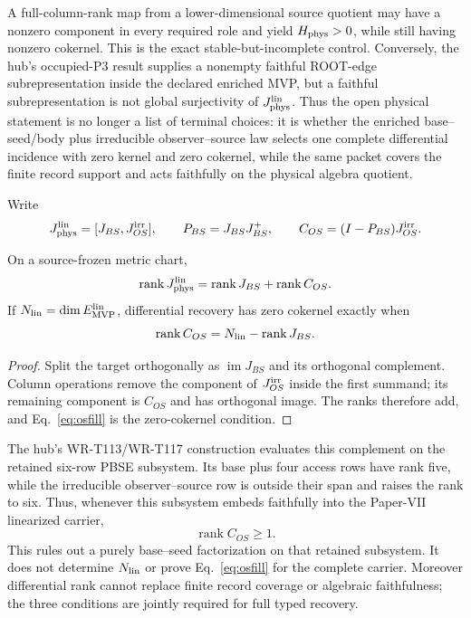 A full-column-rank map from a lower-dimensional source quotient may have a
nonzero component in every required role and yield $H_{\rm phys}>0$, while
still having nonzero cokernel.  This is the exact stable-but-incomplete
control.  Conversely, the hub's occupied-P3 result supplies a nonempty
faithful ROOT-edge subrepresentation inside the declared enriched MVP, but a
faithful subrepresentation is not global surjectivity of
$J_{\rm phys}^{\rm lin}$.
Thus the open physical statement is no longer a list of terminal choices: it
is whether the enriched base--seed/body plus irreducible observer--source law
selects one complete differential incidence with zero kernel and zero
cokernel, while the same packet covers the finite record support and acts
faithfully on the physical algebra quotient.

Write
\begin{equation}
J_{\rm phys}^{\rm lin}=[J_{BS},J_{OS}^{\rm irr}],
\qquad
P_{BS}=J_{BS}J_{BS}^{+},
\qquad
C_{OS}=(I-P_{BS})J_{OS}^{\rm irr}.
\label{eq:oscomplement}
\end{equation}

\begin{proposition}
\label{prop:oscomplement}
On a source-frozen metric chart,
\begin{equation}
\operatorname{rank}J_{\rm phys}^{\rm lin}
=\operatorname{rank}J_{BS}+\operatorname{rank}C_{OS}.
\label{eq:osrank}
\end{equation}
If $N_{\rm lin}=\dim E_{\rm MVP}^{\rm lin}$, differential recovery has zero
cokernel exactly when
\begin{equation}
\operatorname{rank}C_{OS}
=N_{\rm lin}-\operatorname{rank}J_{BS}.
\label{eq:osfill}
\end{equation}
\end{proposition}

\begin{proof}
Split the target orthogonally as $\operatorname{im}J_{BS}$ and its
orthogonal complement. Column operations remove the component of
$J_{OS}^{\rm irr}$ inside the first summand; its remaining component is
$C_{OS}$ and has orthogonal image. The ranks therefore add, and
Eq.~\eqref{eq:osfill} is the zero-cokernel condition.
\end{proof}

The hub's WR-T113/WR-T117 construction evaluates this complement on the
retained six-row PBSE subsystem.  Its base plus four access rows have rank
five, while the irreducible observer--source row is outside their span and
raises the rank to six.  Thus, whenever this subsystem embeds faithfully into
the Paper-VII linearized carrier,
\begin{equation}
\operatorname{rank}C_{OS}\ge1.
\label{eq:pbselowerbound}
\end{equation}
This rules out a purely base--seed factorization on that retained subsystem.
It does not determine $N_{\rm lin}$ or prove Eq.~\eqref{eq:osfill} for the
complete carrier.  Moreover differential rank cannot replace finite record
coverage or algebraic faithfulness; the three conditions are jointly required
for full typed recovery.


